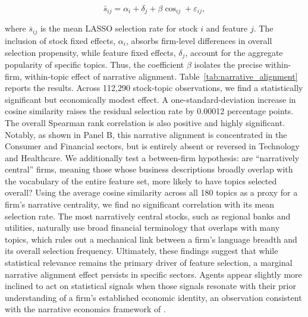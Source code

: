 \documentclass[11pt]{article}
\begin{document}
\begin{equation}\label{eq:narrative_reg}
\bar{s}_{ij} = \alpha_i + \delta_j + \beta \cos_{ij} + \varepsilon_{ij},
\end{equation}

where $\bar{s}_{ij}$ is the mean LASSO selection rate for stock $i$ and feature $j$.
The inclusion of stock fixed effects, $\alpha_i$, absorbs firm-level differences in overall selection propensity, while feature fixed effects, $\delta_j$, account for the aggregate popularity of specific topics.
Thus, the coefficient $\beta$ isolates the precise within-firm, within-topic effect of narrative alignment.
Table~\ref{tab:narrative_alignment} reports the results.
Across 112,290 stock-topic observations, we find a statistically significant but economically modest effect. 
A one-standard-deviation increase in cosine similarity raises the residual selection rate by 0.00012 percentage points.
The overall Spearman rank correlation is also positive and highly significant.
Notably, as shown in Panel B, this narrative alignment is concentrated in the Consumer and Financial sectors, but is entirely absent or reversed in Technology and Healthcare.
We additionally test a between-firm hypothesis: are ``narratively central'' firms, meaning those whose business descriptions broadly overlap with the vocabulary of the entire feature set, more likely to have topics selected overall?
Using the average cosine similarity across all 180 topics as a proxy for a firm's narrative centrality, we find no significant correlation with its mean selection rate.
The most narratively central stocks, such as regional banks and utilities, naturally use broad financial terminology that overlaps with many topics, which rules out a mechanical link between a firm's language breadth and its overall selection frequency.
Ultimately, these findings suggest that while statistical relevance remains the primary driver of feature selection, a marginal narrative alignment effect persists in specific sectors.
Agents appear slightly more inclined to act on statistical signals when those signals resonate with their prior understanding of a firm's established economic identity, an observation consistent with the narrative economics framework of \citet{Shiller2017}.
\end{document}

